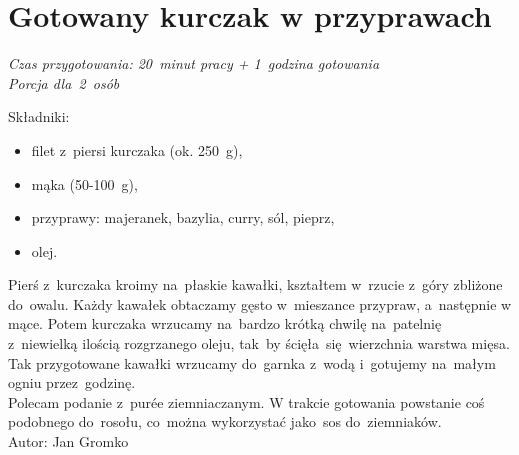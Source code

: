\newpage
\section{Gotowany kurczak w przyprawach}
\vspace*{8pt}


\textit{Czas przygotowania: 20~minut pracy + 1~godzina gotowania}\\
\textit{Porcja dla~2~osób}\\

\vspace{2pt}

Składniki:
\begin{itemize}
	\item filet z~piersi kurczaka (ok. 250~g),
	\item mąka (50-100~g),
	\item przyprawy: majeranek, bazylia, curry, sól, pieprz,
	\item olej.
\end{itemize}

Pierś z~kurczaka kroimy na~płaskie kawałki, kształtem w~rzucie z~góry zbliżone do~owalu. Każdy kawałek obtaczamy gęsto w~mieszance przypraw, a~następnie w mące. Potem kurczaka wrzucamy na~bardzo krótką chwilę na~patelnię z~niewielką ilością rozgrzanego oleju, tak~by ścięła~się wierzchnia warstwa mięsa.\\

Tak przygotowane kawałki wrzucamy do~garnka z~wodą i~gotujemy na~małym ogniu przez~godzinę.\\

Polecam podanie z~purée ziemniaczanym. W trakcie gotowania powstanie coś podobnego do~rosołu, co~można wykorzystać jako~sos do~ziemniaków.\\

Autor: Jan Gromko

